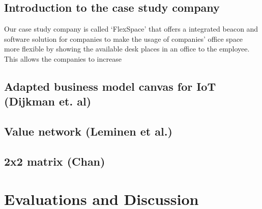 	\subsection{Introduction to the case study company}
	Our case study company is called `FlexSpace' that offers a integrated beacon and software solution for companies to make the usage of companies' office space more flexible by showing the available desk places in an office to the employee. This allows the companies to increase 


	\subsection{Adapted business model canvas for IoT (Dijkman et. al)}

	\subsection{Value network (Leminen et al.)}

	\subsection{2x2 matrix (Chan)}	

\section{Evaluations and Discussion}


